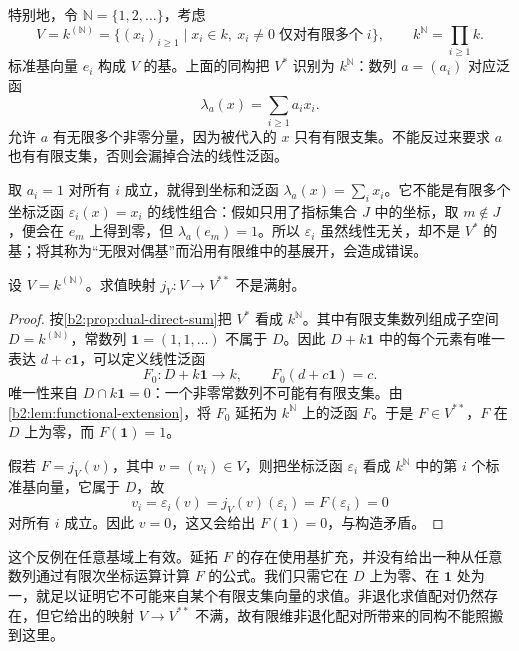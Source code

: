 特别地，令 \(\mathbb N=\{1,2,\ldots\}\)，考虑
\[
	V=k^{(\mathbb N)} =\{(x_i)_{i\ge1}\mid x_i\in k,\ x_i\ne0\;\text{仅对有限多个}\;i\}, \qquad k^{\mathbb N}=\prod_{i\ge1}k.
\]
标准基向量 \(e_i\) 构成 \(V\) 的基。上面的同构把 \(V^*\) 识别为 \(k^{\mathbb N}\)：数列 \(a=(a_i)\) 对应泛函
\[
	\lambda_a(x)=\sum_{i\ge1}a_ix_i.
\]
允许 \(a\) 有无限多个非零分量，因为被代入的 \(x\) 只有有限支集。不能反过来要求 \(a\) 也有有限支集，否则会漏掉合法的线性泛函。

\ProseParagraphBreak
取 \(a_i=1\) 对所有 \(i\) 成立，就得到坐标和泛函 \(\lambda_a(x)=\sum_i x_i\)。它不能是有限多个坐标泛函 \(\varepsilon_i(x)=x_i\) 的线性组合：假如只用了指标集合 \(J\) 中的坐标，取 \(m\notin J\)，便会在 \(e_m\) 上得到零，但 \(\lambda_a(e_m)=1\)。所以 \(\varepsilon_i\) 虽然线性无关，却不是 \(V^*\) 的基；将其称为“无限对偶基”而沿用有限维中的基展开，会造成错误。

\begin{example}[双对偶中不来自求值的泛函]\label{b2:ex:infinite-double-dual}
	设 \(V=k^{(\mathbb N)}\)。求值映射 \(j_V:V\to V^{**}\) 不是满射。
\end{example}

\begin{proof}
	按\cref{b2:prop:dual-direct-sum}把 \(V^*\) 看成 \(k^{\mathbb N}\)。其中有限支集数列组成子空间 \(D=k^{(\mathbb N)}\)，常数列 \(\mathbf1=(1,1,\ldots)\) 不属于 \(D\)。因此 \(D+k\mathbf1\) 中的每个元素有唯一表达 \(d+c\mathbf1\)，可以定义线性泛函
	\[
		F_0:D+k\mathbf1\longrightarrow k, \qquad F_0(d+c\mathbf1)=c.
	\]
	唯一性来自 \(D\cap k\mathbf1=0\)：一个非零常数列不可能有有限支集。由\cref{b2:lem:functional-extension}，将 \(F_0\) 延拓为 \(k^{\mathbb N}\) 上的泛函 \(F\)。于是 \(F\in V^{**}\)，\(F\) 在 \(D\) 上为零，而 \(F(\mathbf1)=1\)。

	假若 \(F=j_V(v)\)，其中 \(v=(v_i)\in V\)，则把坐标泛函 \(\varepsilon_i\) 看成 \(k^{\mathbb N}\) 中的第 \(i\) 个标准基向量，它属于 \(D\)，故
	\[
		v_i=\varepsilon_i(v)=j_V(v)(\varepsilon_i)=F(\varepsilon_i)=0
	\]
	对所有 \(i\) 成立。因此 \(v=0\)，这又会给出 \(F(\mathbf1)=0\)，与构造矛盾。
\end{proof}

这个反例在任意基域上有效。延拓 \(F\) 的存在使用基扩充，并没有给出一种从任意数列通过有限次坐标运算计算 \(F\) 的公式。我们只需它在 \(D\) 上为零、在 \(\mathbf1\) 处为一，就足以证明它不可能来自某个有限支集向量的求值。非退化求值配对仍然存在，但它给出的映射 \(V\to V^{**}\) 不满，故有限维非退化配对所带来的同构不能照搬到这里。

